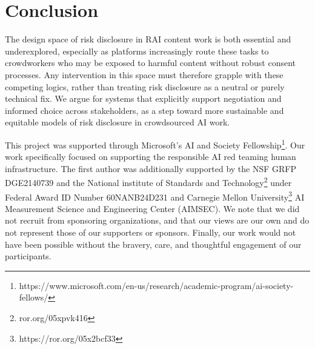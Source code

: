 \section{Conclusion}
The design space of risk disclosure in RAI content work is both essential and underexplored, especially as platforms increasingly route these tasks to crowdworkers who may be exposed to harmful content without robust consent processes. %
 Any intervention in this space must therefore grapple with these competing logics, rather than treating risk disclosure as a neutral or purely technical fix. We argue for systems that explicitly support negotiation and informed choice across stakeholders, as a step toward more sustainable and equitable models of risk disclosure in crowdsourced AI work.

\begin{acks}
This project was supported through Microsoft's AI and Society Fellowship\footnote{https://www.microsoft.com/en-us/research/academic-program/ai-society-fellows/}. Our work specifically focused on supporting the responsible AI red teaming human infrastructure. The first author was additionally supported by the NSF GRFP DGE2140739 and the National institute of Standards and Technology\footnote{ror.org/05xpvk416} under Federal Award ID Number 60NANB24D231 and Carnegie Mellon University\footnote{https://ror.org/05x2bcf33} AI Measurement Science and Engineering Center (AIMSEC). We note that we did not recruit from sponsoring organizations, and that our views are our own and do not represent those of our supporters or sponsors. Finally, our work would not have been possible without the bravery, care, and thoughtful engagement of our participants. 
\end{acks}